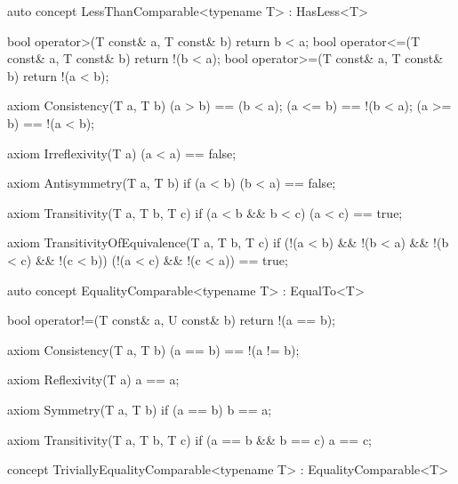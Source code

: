 \documentclass[american,twoside]{book}
\begin{document}
\begin{itemdecl}
auto concept LessThanComparable<typename T> : HasLess<T> {
  bool operator>(T const& a, T const& b) { return b < a; }
  bool operator<=(T const& a, T const& b) { return !(b < a); }
  bool operator>=(T const& a, T const& b) { return !(a < b); }

  axiom Consistency(T a, T b) {
    (a > b) == (b < a);
    (a <= b) == !(b < a);
    (a >= b) == !(a < b);
  }

  axiom Irreflexivity(T a) { (a < a) == false; }

  axiom Antisymmetry(T a, T b) { 
    if (a < b) (b < a) == false;
  }

  axiom Transitivity(T a, T b, T c) {
    if (a < b && b < c) (a < c) == true;
  }

  axiom TransitivityOfEquivalence(T a, T b, T c) {
    if (!(a < b) && !(b < a) && !(b < c) && !(c < b))
      (!(a < c) && !(c < a)) == true;
  } 
}
\end{itemdecl}

\begin{itemdescr}
\pnum 
{}
\end{itemdescr}

\begin{itemdecl}
auto concept EqualityComparable<typename T> : EqualTo<T> {
  bool operator!=(T const& a, U const& b) { return !(a == b); }

  axiom Consistency(T a, T b) {
    (a == b) == !(a != b);
  }

  axiom Reflexivity(T a) { a == a; }

  axiom Symmetry(T a, T b) { if (a == b) b == a; }

  axiom Transitivity(T a, T b, T c) {
    if (a == b && b == c) a == c;
  }
}
\end{itemdecl}

\begin{itemdescr}
\pnum
{}
\end{itemdescr}

\begin{itemdecl}
concept TriviallyEqualityComparable<typename T> : EqualityComparable<T> { }
\end{itemdecl}
\end{document}
